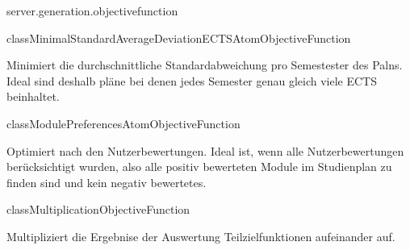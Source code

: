 \begin{texdocpackage}{server.generation.objectivefunction}
\begin{texdocclass}{class}{MinimalStandardAverageDeviationECTSAtomObjectiveFunction}
\label{texdoclet:edu.kit.informatik.studyplan.server.generation.objectivefunction.MinimalStandardAverageDeviationECTSAtomObjectiveFunction}
\begin{texdocclassintro}
Minimiert die durchschnittliche Standardabweichung pro Semestester des Palns. 
 Ideal sind deshalb pläne bei denen jedes Semester genau gleich viele ECTS beinhaltet.\end{texdocclassintro}
\begin{texdocclassconstructors}
\end{texdocclassconstructors}
\begin{texdocclassmethods}
\end{texdocclassmethods}
\end{texdocclass}


\begin{texdocclass}{class}{ModulePreferencesAtomObjectiveFunction}
\label{texdoclet:edu.kit.informatik.studyplan.server.generation.objectivefunction.ModulePreferencesAtomObjectiveFunction}
\begin{texdocclassintro}
Optimiert nach den Nutzerbewertungen. Ideal ist, wenn alle Nutzerbewertungen berücksichtigt wurden, 
 also alle positiv bewerteten Module im Studienplan zu finden sind und kein negativ bewertetes.\end{texdocclassintro}
\begin{texdocclassconstructors}
\end{texdocclassconstructors}
\begin{texdocclassmethods}
\end{texdocclassmethods}
\end{texdocclass}


\begin{texdocclass}{class}{MultiplicationObjectiveFunction}
\label{texdoclet:edu.kit.informatik.studyplan.server.generation.objectivefunction.MultiplicationObjectiveFunction}
\begin{texdocclassintro}
Multipliziert die Ergebnise der Auswertung Teilzielfunktionen aufeinander auf.\end{texdocclassintro}
\begin{texdocclassconstructors}
\end{texdocclassconstructors}
\begin{texdocclassmethods}
\end{texdocclassmethods}
\end{texdocclass}



\end{texdocpackage}
